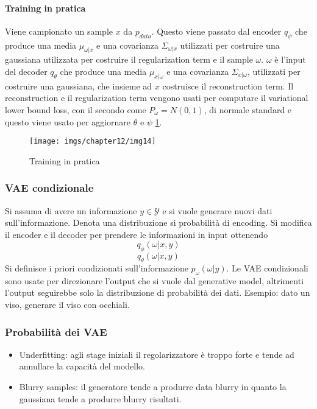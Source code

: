 		\paragraph{Training in pratica}
		Viene campionato un sample $x$ da $p_{data}$.
		Questo viene passato dal encoder $q_\psi$ che produce una media $\mu_{\omega|x}$ e una covarianza $\Sigma_{\omega|x}$ utilizzati per costruire una gaussiana utilizzata per costruire il regularization term e il sample $\omega$.
		$\omega$ \`e l'input del decoder $q_\theta$ che produce una media $\mu_{x|\omega}$ e una covarianza $\Sigma_{x|\omega}$, utilizzati per costruire una gaussiana, che insieme ad $x$ costruisce il reconstruction term.
		Il reconstruction e il regularization term vengono usati per computare il variational lower bound loss, con il secondo come $P_\omega = N(0,1)$, di normale standard e questo viene usato per aggiornare $\theta$ e $\psi$ \ref{fig:chapter12-14}.
		
		\begin{figure}
			\centering
			\texttt{[image: imgs/chapter12/img14]}
			\caption{Training in pratica}
			\label{fig:chapter12-14}
		\end{figure}
		\subsubsection{VAE condizionale}
		Si assuma di avere un informazione $y\in\mathcal{Y}$ e si vuole generare nuovi dati sull'informazione.
		Denota una distribuzione si probabilit\`a di encoding.
		Si modifica il encoder e il decoder per prendere le informazioni in input ottenendo
		$$q_\phi(\omega|x,y)$$
		$$q_\theta(\omega|x,y)$$
		Si definisce i priori condizionati sull'informazione $p_\omega(\omega|y)$.
		Le VAE condizionali sono usate per direzionare l'output che si vuole dal generative model, altrimenti l'output seguirebbe solo la distribuzione di probabilit\`a dei dati. 
		Esempio: dato un viso, generare il viso con occhiali.
		
		\subsubsection{Probabilit\`a dei VAE}
		\begin{itemize}
			\item Underfitting: agli stage iniziali il regolarizzatore \`e troppo forte e tende ad annullare la capacit\`a del modello.
			\item Blurry samples: il generatore tende a produrre data blurry in quanto la gaussiana tende a produrre blurry risultati.
		\end{itemize}

